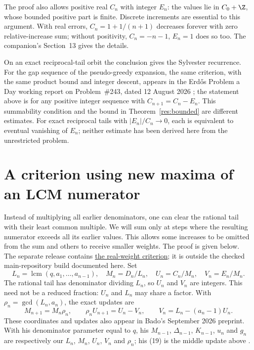 \documentclass[11pt]{article}
\begin{document}
The proof also allows positive real $C_n$ with integer $E_n$: the values
lie in $C_0+\Z$, whose bounded positive part is finite. Discrete increments
are essential to this argument. With real errors, $C_n=1+1/(n+1)$
decreases forever with zero relative-increase sum; without positivity,
$C_n=-n-1$, $E_n=1$ does so too. The companion's Section~13 gives the details.

On an exact reciprocal-tail orbit the conclusion gives the Sylvester
recurrence. For the gap sequence of the pseudo-greedy expansion, the same
criterion, with the same product bound and integer descent, appears in the
Erd\H{o}s Problem a Day working report on Problem~\#243, dated 12 August 2026
\cite[``A global termination criterion'']{erdosproblemaday243}; the statement
above is for any positive integer sequence with $C_{n+1}=C_n-E_n$.
This summability condition and the bound in Theorem~\ref{res:bounded}
are different estimates. For exact reciprocal tails with $|E_n|/C_n\to0$,
each is equivalent to eventual vanishing of $E_n$; neither estimate has
been derived here from the unrestricted problem.

\section{A criterion using new maxima of an LCM numerator}\label{sec:lcmrecords}

Instead of multiplying all earlier denominators, one can clear the
rational tail with their least common multiple. We will sum only at steps
where the resulting numerator exceeds all its earlier values. This allows
some increases to be omitted from the sum and others to receive smaller
weights. The proof is given below. The separate release contains
\href{https://github.com/wcook04/plectis-erdos-lean/blob/52f29ad173b04e3bac941b3663f2b9aebe5de0bb/ErdosProblems/Erdos243/PaperCompleteR8/CanonicalWeightedRecords.lean\#L268}{the real-weight criterion}; it is outside the checked main-repository build documented here.
Set
\[
 L_n=\operatorname{lcm}(q,a_1,\ldots,a_{n-1}),\quad
 M_n=D_n/L_n,\quad U_n=C_n/M_n,\quad V_n=E_n/M_n.
\]
The rational tail has denominator dividing $L_n$, so $U_n$ and $V_n$ are
integers. This need not be a reduced fraction: $U_n$ and $L_n$ may share
a factor. With $\rho_n=\gcd(L_n,a_n)$, the exact updates are
\[
 M_{n+1}=M_n\rho_n,\qquad
 \rho_nU_{n+1}=U_n-V_n,\qquad V_n=L_n-(a_n-1)U_n.
\]
These coordinates and updates also appear in Bado's September 2026
preprint. With his denominator parameter equal to $q$, his $M_{n-1}$,
$\Delta_{n-1}$, $K_{n-1}$, $u_n$ and $g_n$ are respectively our $L_n$,
$M_n$, $U_n$, $V_n$ and $\rho_n$; his (19) is the middle update above
\cite[Proposition~7.1 and (16)--(20), pp.~6--7]{bado2026}.
\end{document}
